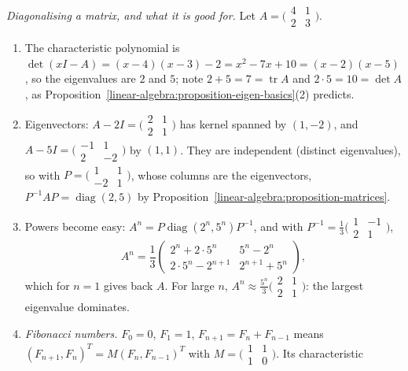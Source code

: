 \begin{example}\label{linear-algebra:example-diagonalisation}
\emph{Diagonalising a matrix, and what it is good for.} Let $A = \bigl(\begin{smallmatrix}4 & 1\\ 2 & 3\end{smallmatrix}\bigr)$.
\begin{enumerate}
\item The characteristic polynomial is $\det(xI - A) = (x - 4)(x - 3) - 2 = x^2 - 7x + 10 = (x - 2)(x - 5)$, so the eigenvalues are $2$ and $5$; note $2 + 5 = 7 = \operatorname{tr}A$ and $2 \cdot 5 = 10 = \det A$,
as Proposition~\ref{linear-algebra:proposition-eigen-basics}(2) predicts.
\item Eigenvectors: $A - 2I = \bigl(\begin{smallmatrix}2 & 1\\ 2 & 1\end{smallmatrix}\bigr)$ has kernel spanned by $(1, -2)$, and $A - 5I = \bigl(\begin{smallmatrix}-1 & 1\\ 2 & -2\end{smallmatrix}\bigr)$ by $(1, 1)$.
They are independent (distinct eigenvalues), so with $P = \bigl(\begin{smallmatrix}1 & 1\\ -2 & 1\end{smallmatrix}\bigr)$, whose columns are the eigenvectors, $P^{-1}AP = \operatorname{diag}(2, 5)$ by
Proposition~\ref{linear-algebra:proposition-matrices}.
\item Powers become easy: $A^n = P\operatorname{diag}(2^n, 5^n)P^{-1}$, and with $P^{-1} = \frac13\bigl(\begin{smallmatrix}1 & -1\\ 2 & 1\end{smallmatrix}\bigr)$,
\[
A^n = \frac13\begin{pmatrix}2^n + 2 \cdot 5^n & 5^n - 2^n\\ 2 \cdot 5^n - 2^{n+1} & 2^{n+1} + 5^n\end{pmatrix},
\]
which for $n = 1$ gives back $A$. For large $n$, $A^n \approx \frac{5^n}3\bigl(\begin{smallmatrix}2 & 1\\ 2 & 1\end{smallmatrix}\bigr)$: the largest eigenvalue dominates.
\item \emph{Fibonacci numbers.} $F_0 = 0$, $F_1 = 1$, $F_{n+1} = F_n + F_{n-1}$ means $(F_{n+1}, F_n)^T = M(F_n, F_{n-1})^T$ with $M = \bigl(\begin{smallmatrix}1 & 1\\ 1 & 0\end{smallmatrix}\bigr)$. Its characteristic

\end{enumerate}
\end{example}
